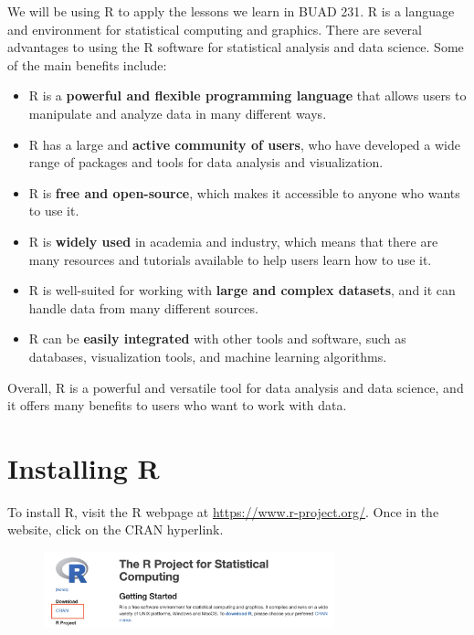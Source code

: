 \documentclass[
  letterpaper,
  DIV=11,
  numbers=noendperiod]{scrreprt}
\begin{document}

We will be using R to apply the lessons we learn in BUAD 231. R is a
language and environment for statistical computing and graphics. There
are several advantages to using the R software for statistical analysis
and data science. Some of the main benefits include:

\begin{itemize}
\item
  R is a \textbf{powerful and flexible programming language} that allows
  users to manipulate and analyze data in many different ways.
\item
  R has a large and \textbf{active community of users}, who have
  developed a wide range of packages and tools for data analysis and
  visualization.
\item
  R is \textbf{free and open-source}, which makes it accessible to
  anyone who wants to use it.
\item
  R is \textbf{widely used} in academia and industry, which means that
  there are many resources and tutorials available to help users learn
  how to use it.
\item
  R is well-suited for working with \textbf{large and complex datasets},
  and it can handle data from many different sources.
\item
  R can be \textbf{easily integrated} with other tools and software,
  such as databases, visualization tools, and machine learning
  algorithms.
\end{itemize}

Overall, R is a powerful and versatile tool for data analysis and data
science, and it offers many benefits to users who want to work with
data.

\hypertarget{installing-r}{%
\section*{Installing R}\label{installing-r}}


To install R, visit the R webpage at \url{https://www.r-project.org/}.
Once in the website, click on the CRAN hyperlink.

\begin{figure}

{\centering \includegraphics[width=0.75\textwidth,height=\textheight]{./images/CRAN.jpeg}

}

\end{figure}
\end{document}
